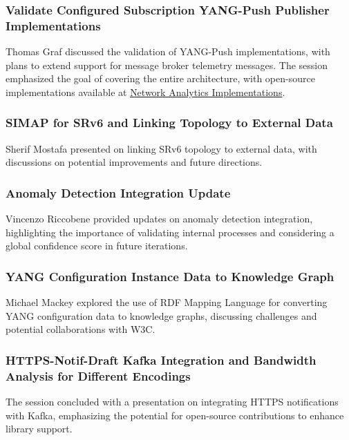 \documentclass{article}
\begin{document}
\subsubsection{Validate Configured Subscription YANG-Push Publisher Implementations}
Thomas Graf discussed the validation of YANG-Push implementations, with plans to extend support for message broker telemetry messages. The session emphasized the goal of covering the entire architecture, with open-source implementations available at \href{https://www.network-analytics.org/yp/implementations.html}{Network Analytics Implementations}.

\subsubsection{SIMAP for SRv6 and Linking Topology to External Data}
Sherif Mostafa presented on linking SRv6 topology to external data, with discussions on potential improvements and future directions.

\subsubsection{Anomaly Detection Integration Update}
Vincenzo Riccobene provided updates on anomaly detection integration, highlighting the importance of validating internal processes and considering a global confidence score in future iterations.

\subsubsection{YANG Configuration Instance Data to Knowledge Graph}
Michael Mackey explored the use of RDF Mapping Language for converting YANG configuration data to knowledge graphs, discussing challenges and potential collaborations with W3C.

\subsubsection{HTTPS-Notif-Draft Kafka Integration and Bandwidth Analysis for Different Encodings}
The session concluded with a presentation on integrating HTTPS notifications with Kafka, emphasizing the potential for open-source contributions to enhance library support.
\end{document}
